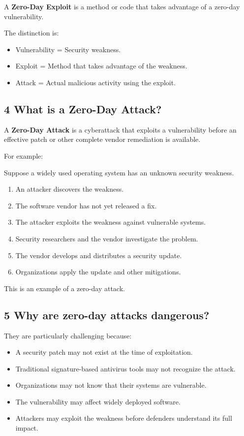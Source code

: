 A \textbf{Zero-Day Exploit} is a method or code that takes advantage of a zero-day vulnerability.

The distinction is:

\begin{itemize}
\item Vulnerability = Security weakness.
\item Exploit = Method that takes advantage of the weakness.
\item Attack = Actual malicious activity using the exploit.
\end{itemize}

\subsection{4 What is a Zero-Day Attack?}

A \textbf{Zero-Day Attack} is a cyberattack that exploits a vulnerability before an effective patch or other complete vendor remediation is available.

For example:

Suppose a widely used operating system has an unknown security weakness.

\begin{enumerate}
\item An attacker discovers the weakness.
\item The software vendor has not yet released a fix.
\item The attacker exploits the weakness against vulnerable systems.
\item Security researchers and the vendor investigate the problem.
\item The vendor develops and distributes a security update.
\item Organizations apply the update and other mitigations.
\end{enumerate}

This is an example of a zero-day attack.

\subsection{5 Why are zero-day attacks dangerous?}

They are particularly challenging because:

\begin{itemize}
\item A security patch may not exist at the time of exploitation.
\item Traditional signature-based antivirus tools may not recognize the attack.
\item Organizations may not know that their systems are vulnerable.
\item The vulnerability may affect widely deployed software.
\item Attackers may exploit the weakness before defenders understand its full impact.
\end{itemize}

